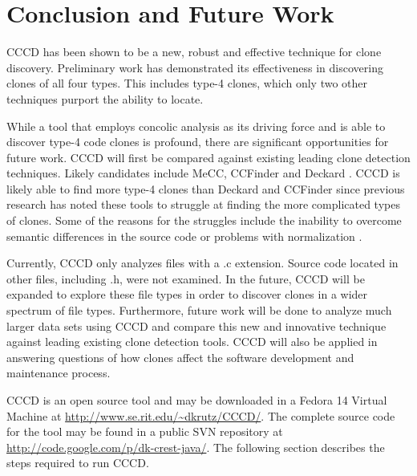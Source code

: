 \documentclass[conference]{IEEEtran}
\begin{document}
\section{Conclusion and Future Work}
\label{sec: conclusion}

CCCD has been shown to be a new, robust and effective technique for clone discovery. Preliminary work has demonstrated its effectiveness in discovering clones of all four types. This includes type-4 clones, which only two other techniques purport the ability to locate.

While a tool that employs concolic analysis as its driving force and is able to discover type-4 code clones is profound, there are significant opportunities for future work. CCCD will first be compared against existing leading clone detection techniques. Likely candidates include MeCC, CCFinder \cite{Kamiya:2002:CMT:636188.636191} and Deckard \cite{Jiang:2007:DSA:1248820.1248843}. CCCD is likely able to find more type-4 clones than Deckard and CCFinder since previous research has noted these tools to struggle at finding the more complicated types of clones. Some of the reasons for the struggles include the inability to overcome semantic differences in the source code or problems with normalization \cite{Roy07asurvey}.

Currently, CCCD only analyzes files with a .c extension. Source code located in other files, including .h, were not examined. In the future, CCCD will be expanded to explore these file types in order to discover clones in a wider spectrum of file types. Furthermore, future work will be done to analyze much larger data sets using CCCD and compare this new and innovative technique against leading existing clone detection tools. CCCD will also be applied in answering questions of how clones affect the software development and maintenance process. 








%
%

\vspace{-0.2in}





\appendix
\label{sec: appendix}

CCCD is an open source tool and may be downloaded in a Fedora 14 Virtual Machine at \url{http://www.se.rit.edu/~dkrutz/CCCD/}. The complete source code for the tool may be found in a public SVN repository at \url{http://code.google.com/p/dk-crest-java/}. The following section describes the steps required to run CCCD.\\
\end{document}
